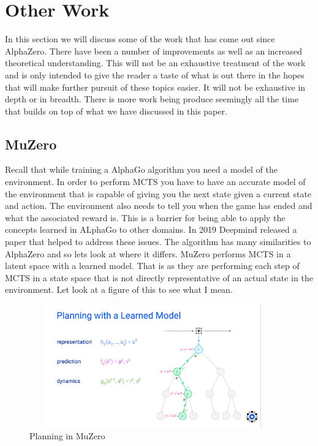 \section{Other Work}

In this section we will discuss some of the work that has come out since AlphaZero. There have been a number of improvements as well as an increased theoretical understanding. This will not be an exhaustive treatment of the work and is only intended to give the reader a taste of what is out there in the hopes that will make further pursuit of these topics easier. It will not be exhaustive in depth or in breadth. There is more work being produce seemingly all the time that builds on top of what we have discussed in this paper. 

\subsection{MuZero}

Recall that while training a AlphaGo algorithm you need a model of the environment. In order to perform MCTS you have to have an accurate model of the environment that is capable of giving you the next state given a current state and action. The environment also needs to tell you when the game has ended and what the associated reward is. This is a barrier for being able to apply the concepts learned in ALphaGo to other domains. In 2019 Deepmind released a paper \cite{muzero} that helped to address these issues. The algorithm has many similarities to AlphaZero and so lets look at where it differs. MuZero performs MCTS in a latent space with a learned model. That is as they are performing each step of MCTS in a state space that is not directly representative of an actual state in the environment. Let look at a figure of this to see what I mean. 

\begin{figure}[H]
       \centering
       \includegraphics[width=400px,height=200px]{images/muzero_learned_model.png}
       \caption{Planning in MuZero}
       \label{fig:my_label}
\end{figure}

